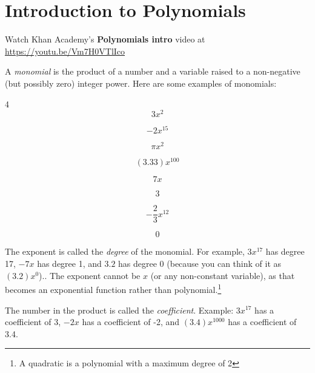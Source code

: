 \chapter{Introduction to Polynomials}

Watch Khan Academy's \textbf{Polynomials intro} video at \url{https://youtu.be/Vm7H0VTlIco}

A \emph{monomial} is the product of a number and a variable raised to a non-negative (but possibly zero) integer power. Here are some examples of monomials:
\begin{multicols}{4}
  \begin{equation*}
    3 x^2
  \end{equation*}

  \begin{equation*}
    -2 x^{15}
  \end{equation*}

  \begin{equation*}
    \pi x^2
  \end{equation*}

  \begin{equation*}
    (3.33)x^{100}
  \end{equation*}

  \begin{equation*}
    7x
  \end{equation*}

  \begin{equation*}
    3
  \end{equation*}

  \begin{equation*}
    -\frac{2}{3}x^{12}
  \end{equation*}

  \begin{equation*}
    0
  \end{equation*}

  
\end{multicols}

The exponent is called the \emph{degree} of the monomial. For example, $3x^{17}$
has degree 17, $-7x$ has degree 1, and $3.2$ has degree 0 (because you can think of it as $(3.2)x^0$).. The exponent cannot be $x$ (or any non-constant variable), as that becomes an exponential function rather than polynomial.\footnote{A quadratic is a polynomial with a maximum degree of 2}

The number in the product is called the \emph{coefficient}.  Example: $3x^{17}$ has a coefficient of 3, $-2x$ has a coefficient of -2, and $(3.4)x^{1000}$ has a coefficient of 3.4.

